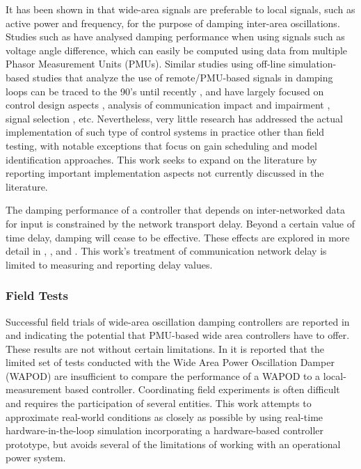 \documentclass{ieeeaccess}
\begin{document}
It has been shown in \cite{Yuwa} that wide-area signals are preferable to local signals, such as active power and frequency\cite{localREMcomparison}, for the purpose of damping inter-area oscillations. Studies such as \cite{Yuwa} have analysed damping performance when using signals such as voltage angle difference, which can easily be computed using data from multiple Phasor Measurement Units (PMUs). Similar studies using off-line simulation-based studies that analyze the use of remote/PMU-based signals in damping loops can be traced to the 90's \cite{lit02} until recently \cite{lit01}, and have largely focused on control design aspects \cite{lit01}, analysis of communication impact and impairment \cite{lit05, lit03}, signal selection \cite{lit04}, etc. Nevertheless, very little research has addressed the actual implementation of such type of control systems in practice other than field testing, with notable exceptions \cite{lit06} that focus on gain scheduling and model identification approaches. This work seeks to expand on the literature by reporting important implementation aspects not currently discussed in the literature.

The damping performance of a controller that depends on inter-networked data for input is constrained by the network transport delay. Beyond a certain value of time delay, damping will cease to be effective. These effects are explored in more detail in \cite{China_paper}, \cite{Biplab}, \cite{lit03} and \cite{lit08}. This work's treatment of communication network delay is limited to measuring and reporting delay values.

\subsubsection{Field Tests}
Successful field trials of wide-area oscillation damping controllers are reported in \cite{WAPODNorway} and \cite{WAPODChina} indicating the potential that PMU-based wide area controllers have to offer. These results are not without certain limitations. In \cite{WAPODNorway} it is reported that the limited set of tests conducted with the Wide Area Power Oscillation Damper (WAPOD) are insufficient to compare the performance of a WAPOD to a local-measurement based controller. Coordinating field experiments is often difficult and requires the participation of several entities. This work attempts to approximate real-world conditions as closely as possible by using real-time hardware-in-the-loop simulation incorporating a hardware-based controller prototype, but avoids several of the limitations of working with an operational power system.
\end{document}
